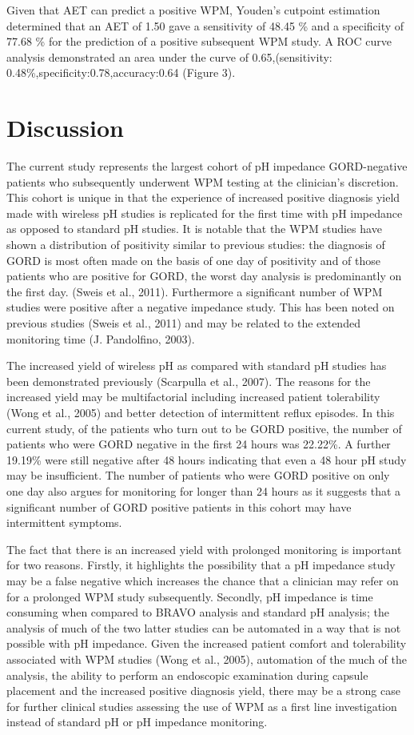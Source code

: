 \documentclass[english,man,floatsintext]{apa6}
\begin{document}
Given that AET can predict a positive WPM, Youden's cutpoint estimation determined that an AET of 1.50 gave a sensitivity of 48.45 \% and a specificity of 77.68 \% for the prediction of a positive subsequent WPM study. A ROC curve analysis demonstrated an area under the curve of 0.65,(sensitivity: 0.48\%,specificity:0.78,accuracy:0.64 (Figure 3).

\hypertarget{discussion}{%
\section{Discussion}\label{discussion}}

The current study represents the largest cohort of pH impedance GORD-negative patients who subsequently underwent WPM testing at the clinician's discretion. This cohort is unique in that the experience of increased positive diagnosis yield made with wireless pH studies is replicated for the first time with pH impedance as opposed to standard pH studies. It is notable that the WPM studies have shown a distribution of positivity similar to previous studies: the diagnosis of GORD is most often made on the basis of one day of positivity and of those patients who are positive for GORD, the worst day analysis is predominantly on the first day. (Sweis et al., 2011). Furthermore a significant number of WPM studies were positive after a negative impedance study. This has been noted on previous studies (Sweis et al., 2011) and may be related to the extended monitoring time (J. Pandolfino, 2003).

The increased yield of wireless pH as compared with standard pH studies has been demonstrated previously (Scarpulla et al., 2007). The reasons for the increased yield may be multifactorial including increased patient tolerability (Wong et al., 2005) and better detection of intermittent reflux episodes. In this current study, of the patients who turn out to be GORD positive, the number of patients who were GORD negative in the first 24 hours was 22.22\%. A further 19.19\% were still negative after 48 hours indicating that even a 48 hour pH study may be insufficient. The number of patients who were GORD positive on only one day also argues for monitoring for longer than 24 hours as it suggests that a significant number of GORD positive patients in this cohort may have intermittent symptoms.

The fact that there is an increased yield with prolonged monitoring is important for two reasons. Firstly, it highlights the possibility that a pH impedance study may be a false negative which increases the chance that a clinician may refer on for a prolonged WPM study subsequently. Secondly, pH impedance is time consuming when compared to BRAVO analysis and standard pH analysis; the analysis of much of the two latter studies can be automated in a way that is not possible with pH impedance. Given the increased patient comfort and tolerability associated with WPM studies (Wong et al., 2005), automation of the much of the analysis, the ability to perform an endoscopic examination during capsule placement and the increased positive diagnosis yield, there may be a strong case for further clinical studies assessing the use of WPM as a first line investigation instead of standard pH or pH impedance monitoring.
\end{document}
